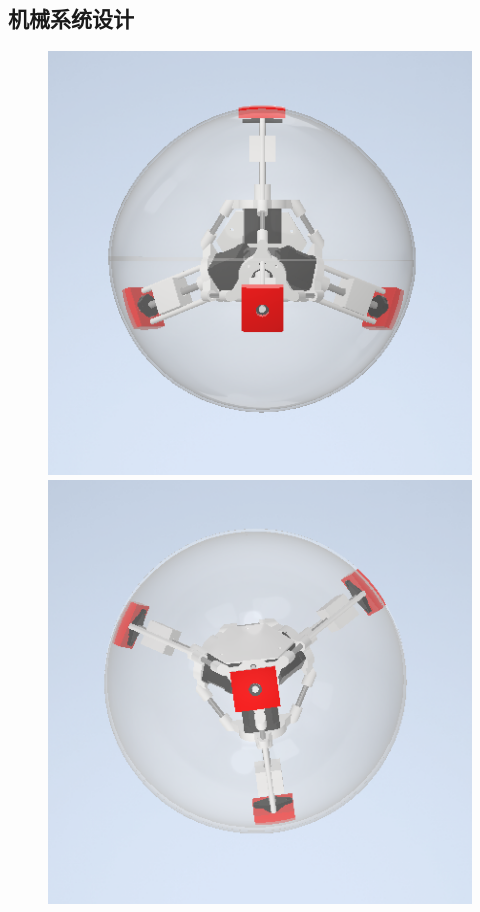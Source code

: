 \documentclass[a4paper]{ctexart}
\numberwithin{equation}{section}
\numberwithin{table}{section}
\numberwithin{figure}{section}
\begin{document}
\subsection{机械系统设计}

\begin{figure}[H]
  \begin{minipage}{0.32\linewidth}
    \begin{center}
      \includegraphics[width=0.98\linewidth]{figures/rendered1.png}
    \end{center}
  \end{minipage}
  \hfill
  \begin{minipage}{0.32\linewidth}
    \begin{center}
      \includegraphics[width=0.98\linewidth]{figures/rendered2.png}

\end{center}
\end{minipage}
\end{figure}
\end{document}

